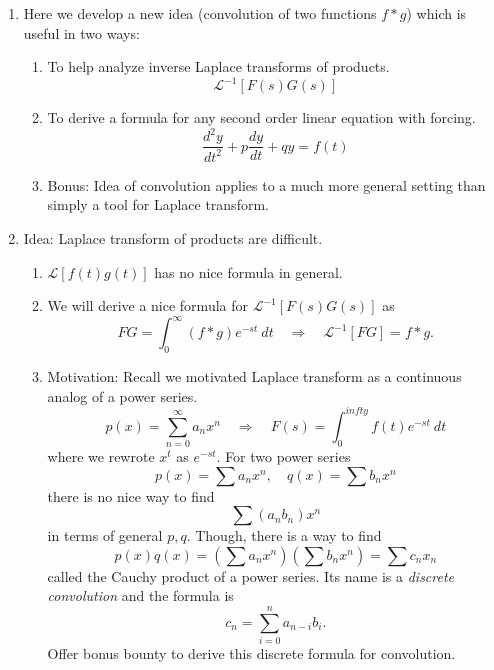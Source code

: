 \documentclass{article}
\begin{document}
\begin{enumerate}

\item Here we develop a new idea (convolution of two functions $f \ast g$) which is useful in two ways:
\begin{enumerate}
\item To help analyze inverse Laplace transforms of products.
\[
\mathcal{L}^{-1} [F(s)G(s)]
\]
\item To derive a formula for any second order linear equation with forcing.
\[
\frac{d^2 y}{dt^2}+p\frac{dy}{dt}+qy = f(t)
\]
\item Bonus: Idea of convolution applies to a much more general setting than simply a tool for Laplace transform.
\end{enumerate}


\item Idea: Laplace transform of products are difficult.
\begin{enumerate}
\item $\mathcal{L}[f(t)g(t)]$ has no nice formula in general.
\item We will derive a nice formula for $\mathcal{L}^{-1}[F(s)G(s)]$ as
\[
F G = \int_0^{\infty} (f \ast g) e^{-st}~dt \quad \Rightarrow \quad \mathcal{L}^{-1}[F G] = f\ast g.
\]
\item Motivation: Recall we motivated Laplace transform as a continuous analog of a power series.
\[
p(x) = \sum_{n=0}^{\infty} a_n x^n \quad \Rightarrow \quad F(s) = \int_0^{infty} f(t) e^{-st}~dt
\]
where we rewrote $x^t$ as $e^{-st}$. For two power series
\[
p(x) = \sum a_n x^n, \quad q(x) = \sum b_n x^n
\]
there is no nice way to find 
\[
\sum (a_n b_n) x^n
\]
in terms of general $p,q$. Though, there is a way to find
\[
p(x) q(x) = \left( \sum a_n x^n \right) \left(\sum b_n x^n \right) = \sum c_n x_n
\]
called the Cauchy product of a power series.
Its name is a \emph{discrete convolution} and the formula is
\[
c_n = \sum_{i=0}^n a_{n-i}b_{i}.
\]
Offer bonus bounty to derive this discrete formula for convolution.
\end{enumerate}



\end{enumerate}
\end{document}
